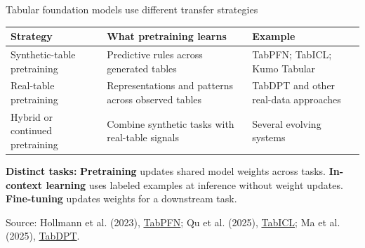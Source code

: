 \documentclass[11pt,aspectratio=169,hyperref={colorlinks}]{beamer}
\newcommand{\slidesource}[1]{\par\vfill\noindent\parbox{\linewidth}{\tiny\color{sourcegray}\raggedright\sloppy Source: #1.}}
\begin{document}
\begin{frame}{Tabular foundation models use different transfer strategies}
\small
\begin{tabularx}{\linewidth}{@{}p{.21\linewidth}p{.31\linewidth}Y@{}}
\toprule
Strategy & What pretraining learns & Example \tabularnewline
\midrule
Synthetic-table pretraining & Predictive rules across generated tables & TabPFN; TabICL; Kumo Tabular \tabularnewline[.45em]
Real-table pretraining & Representations and patterns across observed tables & TabDPT and other real-data approaches \tabularnewline[.45em]
Hybrid or continued pretraining & Combine synthetic tasks with real-table signals & Several evolving systems \tabularnewline
\bottomrule
\end{tabularx}
\medskip
\begin{block}{\textbf{Distinct tasks:}}
\textbf{Pretraining} updates shared model weights across tasks. \textbf{In-context learning} uses labeled examples at inference without weight updates. \textbf{Fine-tuning} updates weights for a downstream task.
\end{block}
\slidesource{Hollmann et al. (2023), \href{https://arxiv.org/abs/2207.01848}{TabPFN}; Qu et al. (2025), \href{https://proceedings.mlr.press/v267/qu25d.html}{TabICL}; Ma et al. (2025), \href{https://proceedings.neurips.cc/paper_files/paper/2025/file/fc0e3f908a2116ba529ad0a1530a3675-Paper-Conference.pdf}{TabDPT}}
\end{frame}
\end{document}
